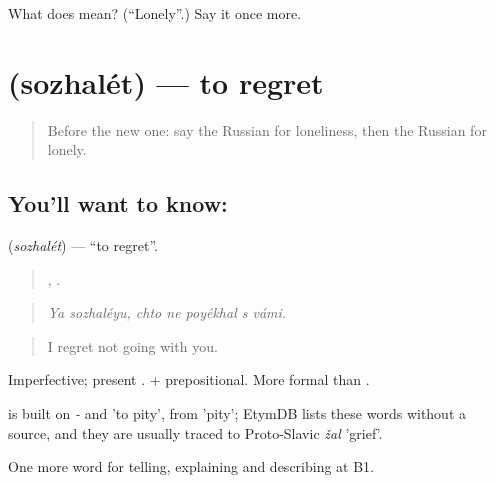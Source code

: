 \begin{tcolorbox}[breakable,colback=teal!4,colframe=teal!35!black,title={Before you move on}]
What does  mean? (\textquotedblleft{}Lonely\textquotedblright{}.) Say it once more.
\end{tcolorbox}
\section[\texorpdfstring{\ru{сожалеть} (sozhalét)}{сожалеть (sozhalét)}]{ (sozhalét) — to regret}

\label{lesson:RU-C477-sozhalet}



\begin{quote}
Before the new one: say the Russian for loneliness, then the Russian for lonely.
\end{quote}

\subsection*{You'll want to know: }
\textbf{} (\emph{sozhalét}) — \textquotedblleft{}to regret\textquotedblright{}.

\begin{quote}
 ,     .
\end{quote}

\begin{quote}
\emph{Ya sozhaléyu, chto ne poyékhal s vámi.}
\end{quote}

\begin{quote}
I regret not going with you.
\end{quote}

Imperfective; present . \emph{ } + prepositional. More formal than \emph{}.

\begin{cousinweb}
\emph{} is built on \emph{-} and \emph{} 'to pity', from \emph{} 'pity'; EtymDB lists these words without a source, and they are usually traced to Proto-Slavic \emph{žal} 'grief'.
\end{cousinweb}

\begin{grammarlens}[title={What you've built}]
One more word for telling, explaining and describing at B1.
\end{grammarlens}

